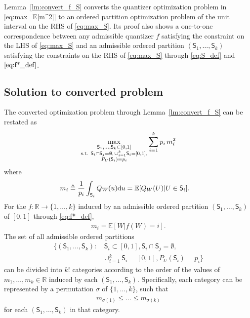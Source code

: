 \documentclass[conference]{IEEEtran}
\newcommand{\R}{\mathbb{R}}
\newcommand{\E}{\mathbb{E}}
\def\sS{{\mathsf S}}
\def\rd{{\rm d}}
\def\deq{\triangleq}
\begin{document}
Lemma~\ref{lm:convert_f_S} converts the quantizer optimization problem in \eqref{eq:max_E[m^2]}
to an ordered partition optimization problem of the unit interval on the RHS of \eqref{eq:max_S}.
Its proof also shows a one-to-one correspondence between any admissible quantizer $f$ satisfying the constraint on the LHS of \eqref{eq:max_S} and an admissible ordered partition $(\sS_1,\ldots,\sS_k)$ satisfying the constraints on the RHS of \eqref{eq:max_S} through \eqref{eq:S_def} and $\eqref{eq:f*_def}$.

\subsection{Solution to converted problem}
The converted optimization problem through Lemma~\ref{lm:convert_f_S} can be restated as
\begin{align}
\max_{\substack{\sS_1,\ldots,\sS_k\subset[0,1] 
\\
\textnormal{s.t. } \sS_i\cap \sS_j = \emptyset, \, \cup_{i=1}^k \sS_i = [0,1], \\
P_U(\sS_i)=p_i}}
\sum_{i=1}^k p_i \, m_i^2 \label{eq:converted_max_Em^2}
\end{align}
where
\begin{align}
    m_i &\deq \frac{1}{p_i}\int_{\sS_i}Q_W(u) \rd u 
    = \E[Q_W(U)|U\in\sS_i].
\end{align}
For the $f:\R\rightarrow\{1,\ldots,k\}$ induced by an admissible ordered partition $(\sS_1,\ldots,\sS_k)$ of $[0,1]$ through \eqref{eq:f*_def}, 
\begin{align}
    m_i = \E[W|f(W)=i] .
\end{align}
The set of all admissible ordered partitions 
\begin{align}
\{(\sS_1,\ldots,\sS_k): 
& \, \sS_i\subset [0,1],  \sS_i\cap \sS_j = \emptyset,  \nonumber \\
&  \cup_{i=1}^k \sS_i = [0,1], P_U(\sS_i)=p_i\} \label{eq:def_set_ord_part}
\end{align}
can be divided into $k!$ categories according to the order of the values of $m_1, \ldots, m_k \in \R$ induced by each $(\sS_1,\ldots,\sS_k)$.
Specifically, each category can be represented by a permutation $\sigma$ of $\{1,\ldots,k\}$, such that 
\begin{align}
    m_{\sigma(1)} \le \ldots \le m_{\sigma(k)} \label{eq:order_m}
\end{align}
for each $(\sS_1,\ldots,\sS_k)$ in that category.
\end{document}
